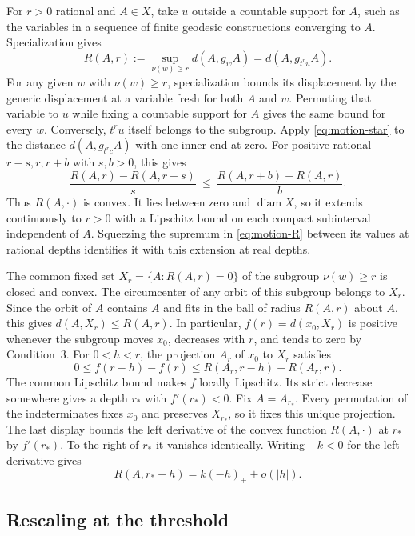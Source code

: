 For \(r>0\) rational and \(A\in X\), take \(u\) outside a countable
support for \(A\), such as the variables in a sequence of finite
geodesic constructions converging to \(A\). Specialization gives
\begin{equation}\label{eq:motion-R}
 R(A,r):=\sup_{\nu(w)\ge r}d(A,g_w A)
          =d(A,g_{t^r u}A).
\end{equation}
For any given \(w\) with \(\nu(w)\ge r\), specialization bounds its
displacement by the generic displacement at a variable fresh for both
\(A\) and \(w\). Permuting that variable to \(u\) while fixing a
countable support for \(A\) gives the same bound for every \(w\).
Conversely, \(t^r u\) itself belongs to the subgroup. Apply
\eqref{eq:motion-star} to the distance \(d(A,g_{t^rc}A)\) with one
inner end at zero. For positive rational \(r-s,r,r+b\) with
\(s,b>0\), this gives
\[
 \frac{R(A,r)-R(A,r-s)}{s}
 \ \le\ \frac{R(A,r+b)-R(A,r)}{b}.
\]
Thus \(R(A,\cdot)\) is convex. It lies between zero and
\(\operatorname{diam}X\), so it extends continuously to \(r>0\) with
a Lipschitz bound on each compact subinterval independent of \(A\).
Squeezing the supremum in \eqref{eq:motion-R} between its values at
rational depths identifies it with this extension at real depths.

The common fixed set \(X_r=\{A:R(A,r)=0\}\) of the subgroup
\(\nu(w)\ge r\) is closed and convex. The circumcenter of any orbit of
this subgroup belongs to \(X_r\). Since the orbit of \(A\) contains
\(A\) and fits in the ball of radius \(R(A,r)\) about \(A\), this gives
\(d(A,X_r)\le R(A,r)\). In particular,
\(f(r)=d(x_0,X_r)\) is positive whenever the subgroup moves \(x_0\),
decreases with \(r\), and tends to zero by Condition~3. For
\(0<h<r\), the projection \(A_r\) of \(x_0\) to \(X_r\) satisfies
\[
 0\le f(r-h)-f(r)\le R(A_r,r-h)-R(A_r,r).
\]
The common Lipschitz bound makes \(f\) locally Lipschitz. Its strict
decrease somewhere gives a depth \(r_*\) with \(f'(r_*)<0\). Fix
\(A=A_{r_*}\). Every permutation of the indeterminates fixes \(x_0\)
and preserves \(X_{r_*}\), so it fixes this unique projection.
The last display bounds the left derivative of the convex function
\(R(A,\cdot)\) at \(r_*\) by \(f'(r_*)\). To the right of \(r_*\) it
vanishes identically. Writing \(-k<0\) for the left derivative gives
\begin{equation}\label{eq:motion-kink}
 R(A,r_*+h)=k(-h)_+ +o(|h|).
\end{equation}

\subsection{Rescaling at the threshold}

